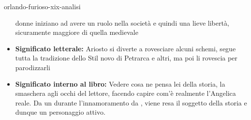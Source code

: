 \documentclass[preview]{standalone}
\begin{document}
\begin{snippet}{orlando-furioso-xix-analisi}
\begin{itemize}
        donne iniziano ad avere un ruolo nella società e quindi una lieve libertà, sicuramente
        maggiore di quella medievale
        \item \textbf{Significato letterale:} Ariosto si diverte a rovesciare alcuni schemi, segue tutta la tradizione
        dello Stil novo di Petrarca e altri, ma poi li rovescia per parodizzarli
        \item \textbf{Significato interno al libro:} Vedere cosa ne pensa lei della storia, la smaschera agli occhi del
        lettore, facendo capire com'è realmente l'Angelica reale.
        Da un  durante l'innamoramento da ,
        viene resa il soggetto della storia e dunque un personaggio attivo.
    \end{itemize}
\end{snippet}
\end{document}
